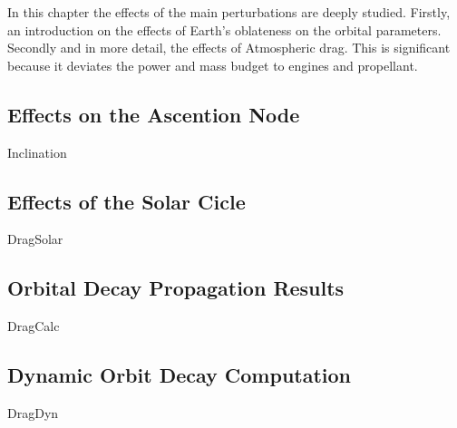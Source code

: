 In this chapter the effects of the main perturbations are deeply studied. Firstly, an introduction on the effects of Earth's oblateness on the orbital parameters. Secondly and in more detail, the effects of Atmospheric drag. This is significant because it deviates the power and mass budget to engines and propellant.

\subsection{Effects on the Ascention Node}
{Inclination}

\subsection{Effects of the Solar Cicle}
{DragSolar}

\subsection{Orbital Decay Propagation Results}
{DragCalc}

\subsection{Dynamic Orbit Decay Computation}
{DragDyn}


